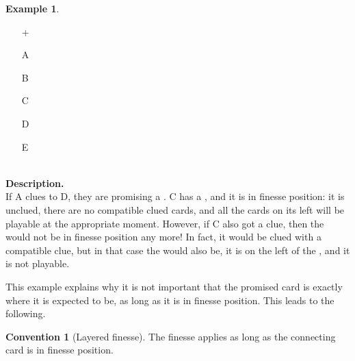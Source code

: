 \documentclass[a4paper]{article}
\theoremstyle{plain}
\theoremstyle{definition}
\newtheorem{example}[theorem]{Example}
\newtheorem{convention}[theorem]{Convention}
\begin{document}
\begin{example} \hfill \\
	\begin{minipage}{0.45\textwidth}
		\begin{itemize}
			\item[\Large +]      
			\item[\Large A]    
			\item[\Large B]    
			\item[\Large C]    
			\item[\Large D]    
			\item[\Large E]    
		\end{itemize}
	\end{minipage}%
	\begin{minipage}{0.55\textwidth}
		\hfill \\
		
		\textbf{Description.} \\
		
		If A clues  to D, they are promising a . C has a , and it is in finesse position: it is unclued, there are no compatible clued cards, and all the cards on its left will be playable at the appropriate moment. However, if C also got a  clue, then the  would not be in finesse position any more! In fact, it would be clued with a compatible clue, but in that case the  would also be, it is on the left of the , and it is not playable.
	\end{minipage}
\end{example} \vspace{0.15 cm}

This example explains why it is not important that the promised card is exactly where it is expected to be, as long as it is in finesse position. This leads to the following.

\begin{convention}[Layered finesse]
	\label{layered-finesse}
	The finesse applies as long as the connecting card is in finesse position.
\end{convention}
\end{document}

